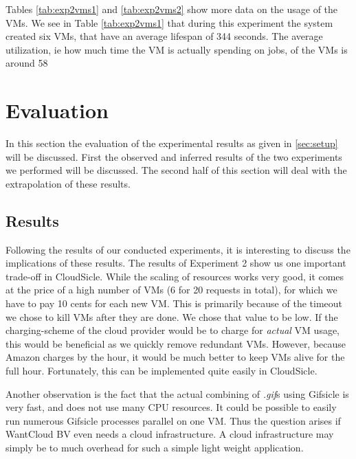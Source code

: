 \documentclass[twocolumn,twoside]{IEEEtran}
\begin{document}
Tables \ref{tab:exp2vms1} and \ref{tab:exp2vms2} show more data on the usage of the VMs. We see in Table \ref{tab:exp2vms1} that during this experiment the system created six VMs, that have an average lifespan of 344 seconds. The average utilization, ie how much time the VM is actually spending on jobs, of the VMs is around 58%

\section{Evaluation}
\label{sec:eval}
In this section the evaluation of the experimental results as given in \autoref{sec:setup} will be discussed.
First the observed and inferred results of the two experiments we performed will be discussed.
The second half of this section will deal with the extrapolation of these results.

\subsection{Results}
Following the results of our conducted experiments, it is interesting to discuss the implications of these results. The results of Experiment 2 show us one important trade-off in CloudSicle. While the scaling of resources works very good, it comes at the price of a high number of VMs (6 for 20 requests in total), for which we have to pay 10 cents for each new VM. This is primarily because of the timeout we chose to kill VMs after they are done. We chose that value to be low. If the charging-scheme of the cloud provider would be to charge for \emph{actual} VM usage, this would be beneficial as we quickly remove redundant VMs. However, because Amazon charges by the hour, it would be much better to keep VMs alive for the full hour. Fortunately, this can be implemented quite easily in CloudSicle.

Another observation is the fact that the actual combining of  \emph{.gif}s using Gifsicle is very fast, and does not use many CPU resources. It could be possible to easily run numerous Gifsicle processes parallel on one VM. Thus the question arises if WantCloud BV even needs a cloud infrastructure. A cloud infrastructure may simply be to much overhead for such a simple light weight application.
\end{document}
